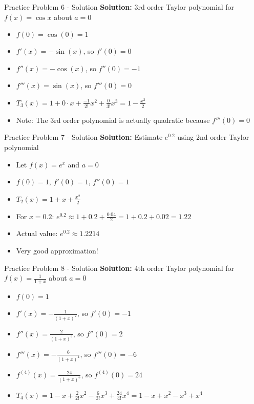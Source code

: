 \documentclass[aspectratio=169]{beamer}
\begin{document}
\begin{frame}{Practice Problem 6 - Solution}
\textbf{Solution:} 3rd order Taylor polynomial for $f(x) = \cos x$ about $a = 0$

\begin{itemize}
    \item $f(0) = \cos(0) = 1$
    \item $f'(x) = -\sin(x)$, so $f'(0) = 0$
    \item $f''(x) = -\cos(x)$, so $f''(0) = -1$
    \item $f'''(x) = \sin(x)$, so $f'''(0) = 0$
    \item $T_3(x) = 1 + 0 \cdot x + \frac{-1}{2!}x^2 + \frac{0}{3!}x^3 = 1 - \frac{x^2}{2}$
    \item Note: The 3rd order polynomial is actually quadratic because $f'''(0) = 0$
\end{itemize}
\end{frame}

\begin{frame}{Practice Problem 7 - Solution}
\textbf{Solution:} Estimate $e^{0.2}$ using 2nd order Taylor polynomial

\begin{itemize}
    \item Let $f(x) = e^x$ and $a = 0$
    \item $f(0) = 1$, $f'(0) = 1$, $f''(0) = 1$
    \item $T_2(x) = 1 + x + \frac{x^2}{2}$
    \item For $x = 0.2$: $e^{0.2} \approx 1 + 0.2 + \frac{0.04}{2} = 1 + 0.2 + 0.02 = 1.22$
    \item Actual value: $e^{0.2} \approx 1.2214$
    \item Very good approximation!
\end{itemize}
\end{frame}

\begin{frame}{Practice Problem 8 - Solution}
\textbf{Solution:} 4th order Taylor polynomial for $f(x) = \frac{1}{1+x}$ about $a = 0$

\begin{itemize}
    \item $f(0) = 1$
    \item $f'(x) = -\frac{1}{(1+x)^2}$, so $f'(0) = -1$
    \item $f''(x) = \frac{2}{(1+x)^3}$, so $f''(0) = 2$
    \item $f'''(x) = -\frac{6}{(1+x)^4}$, so $f'''(0) = -6$
    \item $f^{(4)}(x) = \frac{24}{(1+x)^5}$, so $f^{(4)}(0) = 24$
    \item $T_4(x) = 1 - x + \frac{2}{2!}x^2 - \frac{6}{3!}x^3 + \frac{24}{4!}x^4 = 1 - x + x^2 - x^3 + x^4$
\end{itemize}
\end{frame}
\end{document}
